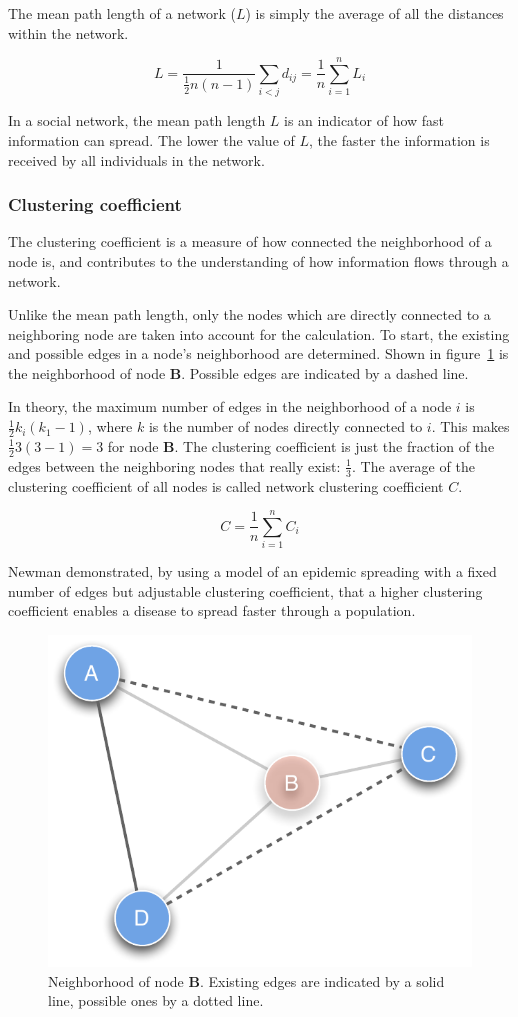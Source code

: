 The mean path length of a network ($L$) is simply the average of all the distances within the network.

\begin{equation}
L = \frac{1}{ \frac{1}{2}n(n-1)}\sum_{i<j} d_{ij} = \frac{1}{n}\sum^n_{i=1}L_i
\label{eq:mean_path_lenght}
\end{equation} 

In a social network, the mean path length $L$ is an indicator of how fast information can spread. The lower the value of $L$, the faster the information is received by all individuals in the network.  

\subsubsection{Clustering coefficient}

The clustering coefficient is a measure of how connected the neighborhood of a node is, and contributes to the understanding of how information flows through a network.

Unlike the mean path length, only the nodes which are directly connected to a neighboring node are taken into account for the calculation. To start, the existing and possible edges in a node's neighborhood are determined. Shown in figure~\ref{fig:clust_coeff} is the neighborhood of node \textbf{B}. Possible edges are indicated by a dashed line.

In theory, the maximum number of edges in the neighborhood of a node $i$ is $\frac{1}{2}k_i(k_1 -1)$, where $k$ is the number of nodes directly connected to $i$. This makes $\frac{1}{2}3(3 -1) = 3$ for node \textbf{B}. The clustering coefficient is just the fraction of the edges between the neighboring nodes that really exist: $\frac{1}{3}$. The average of the clustering coefficient of all nodes is called network clustering coefficient $C$.

\begin{equation}
C = \frac{1}{n}\sum^n_{i=1}C_i
\end{equation}  

Newman\citep{newman:03} demonstrated, by using a model of an epidemic spreading with a fixed number of edges but adjustable clustering coefficient, that a higher clustering coefficient enables a disease to spread faster through a population.

\begin{figure}[htpb]
\begin{center}
  \includegraphics[width=.33\textwidth]{assets/pdf/clustering_coefficient.pdf}
  \caption[Neighborhood of node \textit{B}]{Neighborhood of node \textbf{B}. Existing edges are indicated by a solid line, possible ones by a dotted line.}
  \label{fig:clust_coeff}
\end{center}
\end{figure}
     
